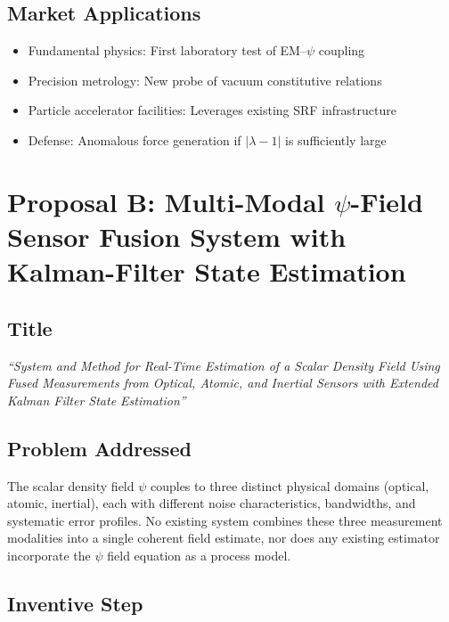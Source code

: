 \documentclass[11pt,a4paper]{article}
\begin{document}
\subsection{Market Applications}

\begin{itemize}[nosep]
\item Fundamental physics: First laboratory test of
EM--$\psi$ coupling
\item Precision metrology: New probe of vacuum constitutive
relations
\item Particle accelerator facilities: Leverages existing SRF
infrastructure
\item Defense: Anomalous force generation if $|\lambda - 1|$
is sufficiently large
\end{itemize}

\section{Proposal B: Multi-Modal $\psi$-Field Sensor Fusion
System with Kalman-Filter State Estimation}

\subsection{Title}

\textit{``System and Method for Real-Time Estimation of a Scalar
Density Field Using Fused Measurements from Optical, Atomic, and
Inertial Sensors with Extended Kalman Filter State Estimation''}

\subsection{Problem Addressed}

The scalar density field $\psi$ couples to three distinct physical
domains (optical, atomic, inertial), each with different noise
characteristics, bandwidths, and systematic error profiles.  No
existing system combines these three measurement modalities into
a single coherent field estimate, nor does any existing estimator
incorporate the $\psi$ field equation as a process model.

\subsection{Inventive Step}
\end{document}
